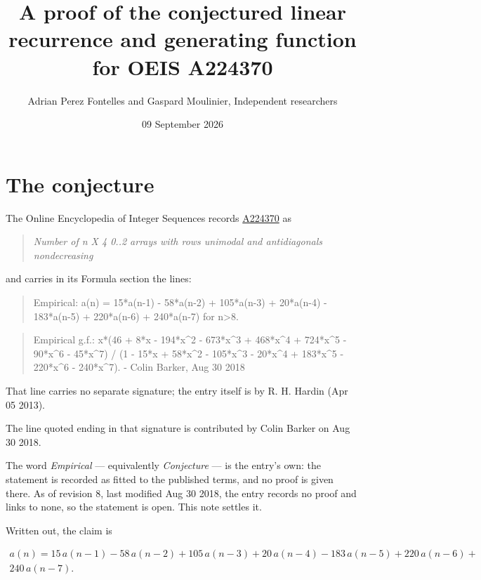 \documentclass[11pt]{article}
\title{A proof of the conjectured linear recurrence and generating function for OEIS A224370}
\author{Adrian Perez Fontelles and Gaspard Moulinier, Independent researchers}
\date{09 September 2026}
\theoremstyle{definition}
\begin{document}
\maketitle
\section{The conjecture}

The Online Encyclopedia of Integer Sequences records \href{https://oeis.org/A224370}{A224370} as

\begin{quote}\itshape Number of n X 4 0..2 arrays with rows unimodal and antidiagonals nondecreasing\end{quote}

and carries in its Formula section the lines:

\begin{quote}\ttfamily Empirical: a(n) = 15*a(n-1) - 58*a(n-2) + 105*a(n-3) + 20*a(n-4) - 183*a(n-5) + 220*a(n-6) + 240*a(n-7) for n>8.\end{quote}

\begin{quote}\ttfamily Empirical g.f.: x*(46 + 8*x - 194*x\textasciicircum{}2 - 673*x\textasciicircum{}3 + 468*x\textasciicircum{}4 + 724*x\textasciicircum{}5 - 90*x\textasciicircum{}6 - 45*x\textasciicircum{}7) / (1 - 15*x + 58*x\textasciicircum{}2 - 105*x\textasciicircum{}3 - 20*x\textasciicircum{}4 + 183*x\textasciicircum{}5 - 220*x\textasciicircum{}6 - 240*x\textasciicircum{}7). - Colin Barker, Aug 30 2018\end{quote}

That line carries no separate signature; the entry itself is by R. H. Hardin (Apr 05 2013).

The line quoted ending in that signature is contributed by Colin Barker on Aug 30 2018.

The word {\itshape Empirical} --- equivalently {\itshape Conjecture} --- is the entry's own: the statement is recorded as fitted to the published terms, and no proof is given there. As of revision 8, last modified Aug 30 2018, the entry records no proof and links to none, so the statement is open. This note settles it.

Written out, the claim is

\begin{multline*} a(n) = 15\,a(n-1) - 58\,a(n-2) + 105\,a(n-3) + 20\,a(n-4) - 183\,a(n-5) + 220\,a(n-6) + \\ 240\,a(n-7). \end{multline*}
\end{document}
